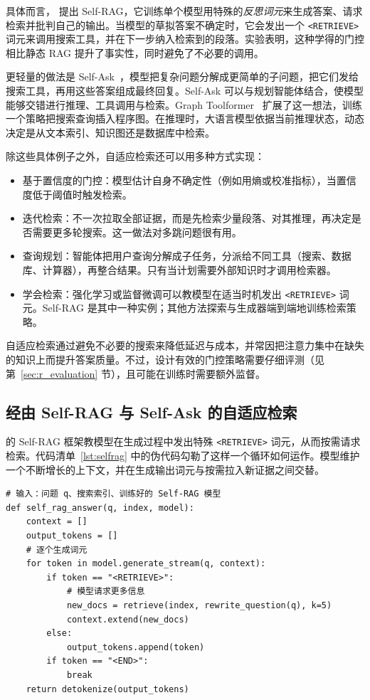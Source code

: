 具体而言，\citet{asai2023selfrag} 提出 Self-RAG，它训练单个模型用特殊的\emph{反思词元}来生成答案、请求检索并批判自己的输出。当模型的草拟答案不确定时，它会发出一个 \texttt{<RETRIEVE>} 词元来调用搜索工具，并在下一步纳入检索到的段落。实验表明，这种学得的门控相比静态 RAG 提升了事实性，同时避免了不必要的调用。

更轻量的做法是 Self-Ask~\citep{press2022measuring}，模型把复杂问题分解成更简单的子问题，把它们发给搜索工具，再用这些答案组成最终回复。Self-Ask 可以与规划智能体结合，使模型能够交错进行推理、工具调用与检索。Graph Toolformer~\citep{zhang2023graph} 扩展了这一想法，训练一个策略把搜索查询插入程序图。在推理时，大语言模型依据当前推理状态，动态决定是从文本索引、知识图还是数据库中检索。

除这些具体例子之外，自适应检索还可以用多种方式实现：
\begin{itemize}
\item 基于置信度的门控：模型估计自身不确定性（例如用熵或校准指标），当置信度低于阈值时触发检索。
\item 迭代检索：不一次拉取全部证据，而是先检索少量段落、对其推理，再决定是否需要更多轮搜索。这一做法对多跳问题很有用。
\item 查询规划：智能体把用户查询分解成子任务，分派给不同工具（搜索、数据库、计算器），再整合结果。只有当计划需要外部知识时才调用检索器。
\item 学会检索：强化学习或监督微调可以教模型在适当时机发出 \texttt{<RETRIEVE>} 词元。Self-RAG 是其中一种实例；其他方法探索与生成器端到端地训练检索策略。
\end{itemize}
%
自适应检索通过避免不必要的搜索来降低延迟与成本，并常因把注意力集中在缺失的知识上而提升答案质量。不过，设计有效的门控策略需要仔细评测（见第~\ref{sec:r_evaluation} 节），且可能在训练时需要额外监督。


\subsection{经由 Self-RAG 与 Self-Ask 的自适应检索}

\citet{asai2023selfrag} 的 Self-RAG 框架教模型在生成过程中发出特殊 \texttt{<RETRIEVE>} 词元，从而按需请求检索。代码清单~\ref{lst:selfrag} 中的伪代码勾勒了这样一个循环如何运作。模型维护一个不断增长的上下文，并在生成输出词元与按需拉入新证据之间交替。

\begin{listing}[!ht]
\begin{verbatim}
# 输入：问题 q、搜索索引、训练好的 Self-RAG 模型
def self_rag_answer(q, index, model):
    context = []
    output_tokens = []
    # 逐个生成词元
    for token in model.generate_stream(q, context):
        if token == "<RETRIEVE>":
            # 模型请求更多信息
            new_docs = retrieve(index, rewrite_question(q), k=5)
            context.extend(new_docs)
        else:
            output_tokens.append(token)
        if token == "<END>":
            break
    return detokenize(output_tokens)
\end{verbatim}
\caption{演示 Self-RAG 的高层伪代码}
\label{lst:selfrag}
\end{listing}

